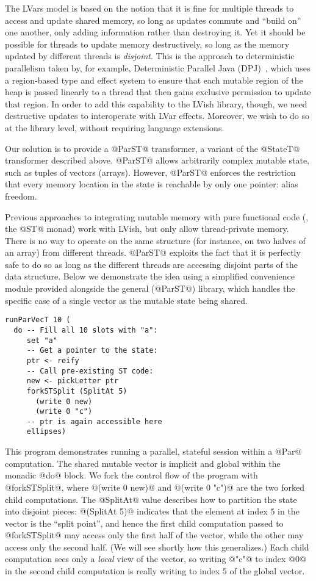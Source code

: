 The LVars model is based on the notion that it is fine for multiple
threads to access and update shared memory, so long as updates commute
and ``build on'' one another, only adding information rather than
destroying it.  Yet it should be possible for threads to update memory
destructively, so long as the memory updated by different threads is
\emph{disjoint}.  This is the approach to deterministic parallelism
taken by, for example, Deterministic Parallel Java
(DPJ)~\cite{dpj-oopsla}, which uses a region-based type and effect
system to ensure that each mutable region of the heap is passed
linearly to a thread that then gains exclusive permission to update
that region.  In order to add this capability to the LVish library,
though, we need destructive updates to interoperate with LVar effects.
Moreover, we wish to do so at the library level, without requiring
language extensions.

Our solution is to provide a @ParST@ transformer, a variant of the
@StateT@ transformer described above.  @ParST@ allows arbitrarily
complex mutable state, such as tuples of vectors (arrays).  However,
@ParST@ enforces the restriction that {every} memory location in the
state is reachable by only one pointer: alias freedom.

Previous approaches to integrating mutable memory with pure functional
code (\ie, the @ST@ monad) work with LVish, but only allow
thread-private memory.  There is no way to operate on the same
structure (for instance, on two halves of an array) from different
threads.  @ParST@ exploits the fact that it is perfectly safe to do so
as long as the different threads are accessing disjoint parts of the
data structure.  Below we demonstrate the idea using a simplified
convenience module provided alongside the general (@ParST@) library,
which handles the specific case of a single vector as the mutable
state being shared.

\singlespacing
\begin{lstlisting}
runParVecT 10 (
  do -- Fill all 10 slots with "a":
     set "a"
     -- Get a pointer to the state:
     ptr <- reify 
     -- Call pre-existing ST code:
     new <- pickLetter ptr
     forkSTSplit (SplitAt 5)
       (write 0 new)
       (write 0 "c")
     -- ptr is again accessible here
     ellipses)
\end{lstlisting}
\doublespacing

This program demonstrates running a parallel, stateful session within
a @Par@ computation.  The shared mutable vector is implicit and global
within the monadic @do@ block.  We fork the control flow of the
program with @forkSTSplit@, where @(write 0 new)@ and @(write 0 "c")@
are the two forked child computations.  The @SplitAt@ value describes
how to partition the state into disjoint pieces: @(SplitAt 5)@
indicates that the element at index $5$ in the vector is the ``split
point'', and hence the first child computation passed to @forkSTSplit@
may access only the first half of the vector, while the other may
access only the second half.  (We will see shortly how this
generalizes.)  Each child computation sees only a \emph{local} view of
the vector, so writing @"c"@ to index @0@ in the second child
computation is really writing to index $5$ of the global vector.

